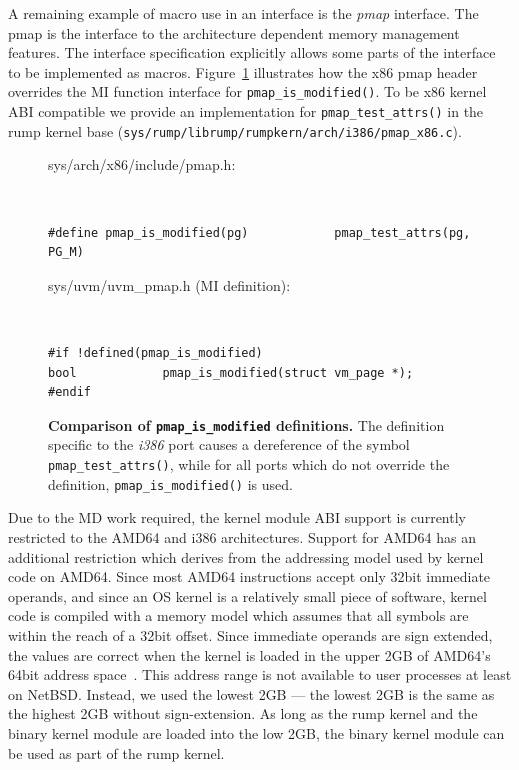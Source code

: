 A remaining example of macro use in an interface is the \textit{pmap}
interface.  The pmap is the interface to the architecture dependent
memory management features.  The interface specification explicitly
allows some parts of the interface to be implemented as macros.
Figure~\ref{fig:pmapmacros} illustrates how the x86 pmap header
overrides the MI function interface for \verb+pmap_is_modified()+.
To be x86 kernel ABI compatible we provide an implementation
for \verb+pmap_test_attrs()+ in the rump kernel base
(\verb+sys/rump/librump/rumpkern/arch/i386/pmap_x86.c+).

\begin{figure}[t]
\begin{flushleft}
sys/arch/x86/include/pmap.h:
{\tt \scriptsize  
\begin{verbatim}
#define pmap_is_modified(pg)            pmap_test_attrs(pg, PG_M)
\end{verbatim}}

sys/uvm/uvm\_pmap.h (MI definition):
{\tt \scriptsize  
\begin{verbatim}
#if !defined(pmap_is_modified)
bool            pmap_is_modified(struct vm_page *);
#endif
\end{verbatim}}
\end{flushleft}
\caption[Comparison of \texttt{pmap\_is\_modified} definitions]{
\textbf{Comparison of \texttt{pmap\_is\_modified} definitions.}
The definition specific to the \textit{i386} port causes a dereference of the
symbol \texttt{pmap\_test\_attrs()}, while for all ports which do not
override the definition, \texttt{pmap\_is\_modified()} is used.
}
\label{fig:pmapmacros}
\end{figure}

Due to the MD work required, the kernel module ABI support is
currently restricted to the AMD64 and i386 architectures.  Support
for AMD64 has an additional restriction which derives from the
addressing model used by kernel code on AMD64.  Since most AMD64
instructions accept only 32bit immediate operands, and since an OS
kernel is a relatively small piece of software, kernel code is
compiled with a memory model which assumes that all symbols are
within the reach of a 32bit offset.  Since immediate operands are
sign extended, the values are correct when the kernel is loaded in
the upper 2GB of AMD64's 64bit address space~\cite{amd64abi}.  This
address range is not available to user processes at least on NetBSD.
Instead, we used the lowest 2GB --- the lowest 2GB is the same as
the highest 2GB without sign-extension.  As long as the rump kernel
and the binary kernel module are loaded into the low 2GB, the binary
kernel module can be used as part of the rump kernel.

